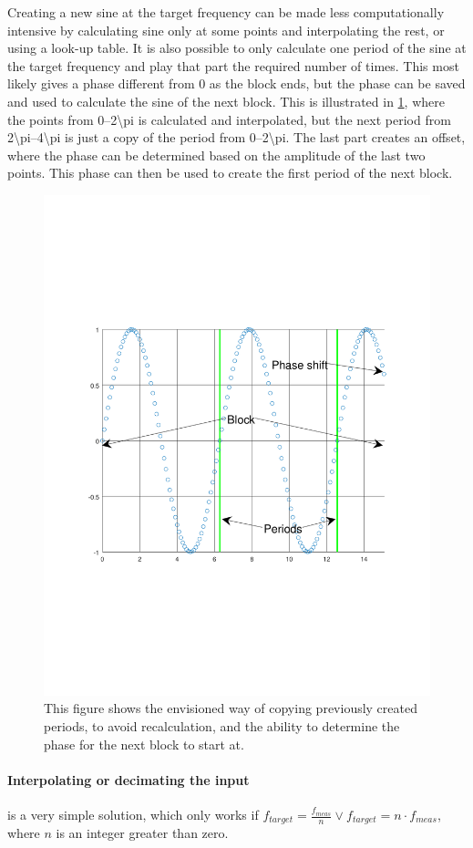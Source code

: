 Creating a new sine at the target frequency can be made less computationally intensive by calculating sine only at some points and interpolating the rest, or using a look-up table.
It is also possible to only calculate one period of the sine at the target frequency and play that part the required number of times.
This most likely gives a phase different from 0 as the block ends, but the phase can be saved and used to calculate the sine of the next block.
This is illustrated in \cref{fig:sinblocks}, where the points from \numrange{0}{2\pi} is calculated and interpolated, but the next period from \numrange{2\pi}{4\pi} is just a copy of the period from \numrange{0}{2\pi}.
The last part creates an offset, where the phase can be determined based on the amplitude of the last two points.
This phase can then be used to create the first period of the next block.

\begin{figure}
	\centering
	\includegraphics[width=0.7\linewidth, clip, trim={2cm 7cm 2cm 7cm}]{gfx/Analysis/SinBlocks.pdf}
	\caption{This figure shows the envisioned way of copying previously created periods, to avoid recalculation, and the ability to determine the phase for the next block to start at.}
	\label{fig:sinblocks}
\end{figure}

\paragraph{Interpolating or decimating the input} is a very simple solution, which only works if $f_{target}=\frac{f_{meas}}{n}\vee f_{target} =n\cdot f_{meas}$, where $n$ is an integer greater than zero.

\FloatBarrier